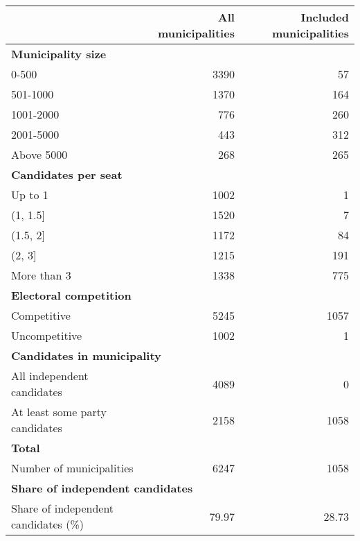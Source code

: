 
\begin{tabular}{lrr}
\toprule
 & All municipalities & Included municipalities\\
\midrule
\multicolumn{3}{l}{\textbf{Municipality size}} \\
0-500 & 3390 & 57\\
501-1000 & 1370 & 164\\
1001-2000 & 776 & 260\\
2001-5000 & 443 & 312\\
Above 5000 & 268 & 265\\
\midrule
\multicolumn{3}{l}{\textbf{Candidates per seat}} \\
Up to 1 & 1002 & 1\\
(1, 1.5] & 1520 & 7\\
(1.5, 2] & 1172 & 84\\
(2, 3] & 1215 & 191\\
More than 3 & 1338 & 775\\
\midrule
\multicolumn{3}{l}{\textbf{Electoral competition}} \\
Competitive & 5245 & 1057\\
Uncompetitive & 1002 & 1\\
\midrule
\multicolumn{3}{l}{\textbf{Candidates in municipality}} \\
All independent candidates & 4089 & 0\\
At least some party candidates & 2158 & 1058\\
\midrule
\multicolumn{3}{l}{\textbf{Total}} \\
Number of municipalities & 6247 & 1058 \\ 
\midrule
\multicolumn{3}{l}{\textbf{Share of independent candidates}}\\
Share of independent candidates (\%) & 79.97 & 28.73\\
\bottomrule
\end{tabular}
